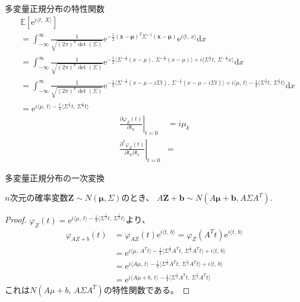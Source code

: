 \documentclass[lualatex,handout]{beamer}
\newcommand{\expt}[1]{\mathbb{E}\left[#1\right]}
\theoremstyle{definition}
\begin{document}
\begin{frame}{多変量正規分布の特性関数}
\small
\begin{align*}
&\expt{\mathrm{e}^{i\langle t,\,X\rangle}}\\
&=\int_{-\infty}^\infty \frac1{\sqrt{(2\pi)^n\det(\Sigma)}} \mathrm{e}^{-\frac12 (\symbf{x}-\symbf{\mu})^T\Sigma^{-1} (\symbf{x}-\symbf{\mu})}\mathrm{e}^{i\langle t,\, x\rangle}\mathrm{d}x\\
&= \int_{-\infty}^\infty \frac1{\sqrt{(2\pi)^n\det(\Sigma)}} \mathrm{e}^{-\frac12 \langle\Sigma^{-\frac12}(x-\mu),\,\Sigma^{-\frac12}(x-\mu)\rangle+i\langle \Sigma^{\frac12}t,\, \Sigma^{-\frac12}x\rangle}\mathrm{d}x\\
&= \int_{-\infty}^\infty \frac1{\sqrt{(2\pi)^n\det(\Sigma)}} \mathrm{e}^{-\frac12 \langle\Sigma^{-\frac12}(x-\mu-i\Sigma t),\,\Sigma^{-\frac12}(x-\mu-i\Sigma t)\rangle +i\langle \mu,\, t\rangle - \frac12\langle \Sigma^\frac12t,\,\Sigma^\frac12t\rangle}\mathrm{d}x\\
&= \mathrm{e}^{i\langle \mu,\, t\rangle - \frac12\langle \Sigma^\frac12t,\,\Sigma^\frac12t\rangle}
\end{align*}
\begin{align*}
\left.\frac{\partial \varphi_Z(t)}{\partial t_k}\right|_{t=0} &= i\mu_k\\
\left.\frac{\partial^2 \varphi_Z(t)}{\partial t_k\partial t_\ell}\right|_{t=0} &= 
\end{align*}
\end{frame}

\begin{frame}{多変量正規分布の一次変換}
\begin{lemma}
$n$次元の確率変数$\symbf{Z}\sim N(\symbf{\mu}, \Sigma)$のとき、
$A\symbf{Z}+\symbf{b}\sim N(A\symbf{\mu}+\symbf{b}, A\Sigma A^T)$.
\end{lemma}
\begin{proof}
$\varphi_Z(t) = \mathrm{e}^{i\langle \mu,\, t\rangle - \frac12\langle \Sigma^\frac12t,\,\Sigma^\frac12t\rangle}$より、
\begin{align*}
\varphi_{AZ+b}(t) &= \varphi_{AZ}(t)\mathrm{e}^{i\langle t,\,b\rangle} = \varphi_Z(A^Tt)\mathrm{e}^{i\langle t,\,b\rangle}\\
&= \mathrm{e}^{i\langle \mu,\, A^T t\rangle - \frac12\langle \Sigma^\frac12A^T t,\,\Sigma^\frac12A^T t\rangle + i\langle t,\,b\rangle}\\
&= \mathrm{e}^{i\langle A\mu,\, t\rangle - \frac12\langle \Sigma^\frac12A^T t,\,\Sigma^\frac12A^T t\rangle+ i\langle t,\,b\rangle}\\
&= \mathrm{e}^{i\langle A\mu + b,\, t\rangle - \frac12\langle \Sigma^\frac12A^T t,\,\Sigma^\frac12A^T t\rangle}
\end{align*}
これは$N(A\mu+b,\, A\Sigma A^T)$の特性関数である。
\end{proof}
\end{frame}
\end{document}

